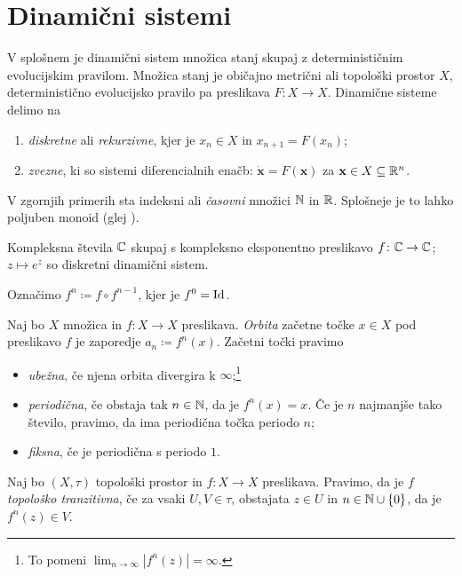 \section{Dinamični sistemi} \label{sec:dis}

V splošnem je dinamični sistem množica stanj skupaj z determinističnim evolucijskim pravilom. Množica stanj je običajno metrični ali topološki prostor \(X\), deterministično evolucijsko pravilo pa preslikava \(F \colon X \to X\). Dinamične sisteme delimo na

\begin{enumerate}
    \item \emph{diskretne} ali \emph{rekurzivne}, kjer je \(x_n \in X\) in \(x_{n + 1} = F (x_n)\);
    \item \emph{zvezne}, ki so sistemi diferencialnih enačb: \(\dot{\mathbf{x}} = F (\mathbf{x})\) za \(\mathbf{x} \in X \subseteq \mathbb R^n\).
\end{enumerate}

\noindent V zgornjih primerih sta indeksni ali \emph{časovni} množici \(\mathbb N\) in \(\mathbb R\). Splošneje je to lahko poljuben monoid (glej \cite{Giunti_2012}).

\begin{zgled}
    Kompleksna števila \(\mathbb C\) skupaj s kompleksno eksponentno preslikavo \(f \colon \mathbb C \to \mathbb C\); \(z \mapsto e^{z}\) so diskretni dinamični sistem.
\end{zgled}

\noindent Označimo \(f^n \coloneq f \circ f^{n - 1}\), kjer je \(f^0 = \operatorname{Id}\).

\begin{definicija}
    Naj bo \(X\) množica in \(f \colon X \to X\) preslikava. \emph{Orbita} začetne točke \(x \in X\) pod preslikavo \(f\) je zaporedje \(a_n \coloneq f^n (x)\). Začetni točki pravimo
    \begin{itemize}
        \item \emph{ubežna}, če njena orbita divergira k \(\infty\);\footnote{To pomeni \(\lim_{n \to \infty} |f^n (z)| = \infty\).}
        \item \emph{periodična}, če obstaja tak \(n \in \mathbb N\), da je \(f^n (x) = x\). Če je \(n\) najmanjše tako število, pravimo, da ima periodična točka periodo \(n\);
        \item \emph{fiksna}, če je periodična s periodo \(\num{1}\).
    \end{itemize}
\end{definicija}

\begin{definicija}
    Naj bo \((X, \tau)\) topološki prostor in \(f \colon X \to X\) preslikava. Pravimo, da je \(f\) \emph{topološko tranzitivna}, če za vsaki \(U, V \in \tau\), obstajata \(z \in U\) in \(n \in \mathbb N \cup \left\{ 0 \right\}\), da je \(f^n (z) \in V\).
\end{definicija}

